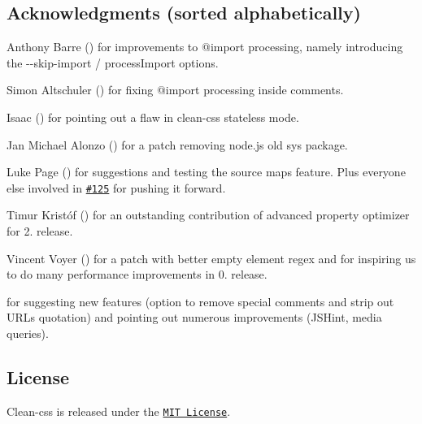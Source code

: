 \subsection*{Acknowledgments (sorted alphabetically)}


\begin{DoxyItemize}
\item Anthony Barre (\href{https://github.com/abarre}{\tt }) for improvements to {\ttfamily @import} processing, namely introducing the {\ttfamily -\/-\/skip-\/import} / {\ttfamily process\+Import} options.
\item Simon Altschuler (\href{https://github.com/altschuler}{\tt }) for fixing {\ttfamily @import} processing inside comments.
\item Isaac (\href{https://github.com/facelessuser}{\tt }) for pointing out a flaw in clean-\/css\textquotesingle{} stateless mode.
\item Jan Michael Alonzo (\href{https://github.com/jmalonzo}{\tt }) for a patch removing node.\+js\textquotesingle{} old {\ttfamily sys} package.
\item Luke Page (\href{https://github.com/lukeapage}{\tt }) for suggestions and testing the source maps feature. Plus everyone else involved in \href{https://github.com/jakubpawlowicz/clean-css/issues/125}{\tt \#125} for pushing it forward.
\item Timur Kristóf (\href{https://github.com/Venemo}{\tt }) for an outstanding contribution of advanced property optimizer for 2. release.
\item Vincent Voyer (\href{https://github.com/vvo}{\tt }) for a patch with better empty element regex and for inspiring us to do many performance improvements in 0. release.
\item \href{https://github.com/XhmikosR}{\tt } for suggesting new features (option to remove special comments and strip out U\+R\+Ls quotation) and pointing out numerous improvements (J\+S\+Hint, media queries).
\end{DoxyItemize}

\subsection*{License}

Clean-\/css is released under the \href{https://github.com/jakubpawlowicz/clean-css/blob/master/LICENSE}{\tt M\+IT License}. 